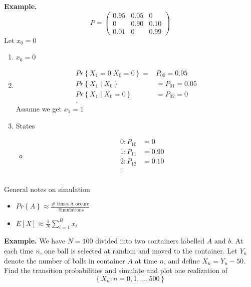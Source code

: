\documentclass{article}
\theoremstyle{remark}
\begin{document}
 \begin{tcolorbox}
   \textbf{Example.} 
   \[
   P = \begin{pmatrix}
   0.95  &  0.05  &  0 \\
   0  &  0.90  &  0.10 \\
   0.01  &  0  &  0.99
   \end{pmatrix} 
   \] 
   Let $x_{0} = 0$
   \begin{enumerate}
     \item $x_{0} = 0$  
     \item 
       \begin{align*}
       Pr \left \{ X_{1} = 0 | X_{0} = 0 \right \} = &  P_{00} = 0.95  \\
       Pr \left \{ X_{1}  \mid  X_{0}  \right \}  &=  P_{01} = 0.05 \\
       Pr \left \{ X_{1}  \mid  X_{0} = 0 \right \}  &=  P_{02} = 0 \\
       .\end{align*}
       Assume we get $x_{1} = 1$
     \item States 
       \begin{itemize}
         \item \[
             \begin{split}
         0: P_{10}  &=  0 \\
         1: P_{11 } &=  0.90 \\
         2: P_{12} &=  0.10 \\
         \vdots  \\
             \end{split} 
         \] 
       \end{itemize}
   \end{enumerate}
 \end{tcolorbox}

 \begin{tcolorbox}
   General notes on simulation 
   \begin{itemize}
     \item
   $Pr \left \{ A  \right \} \approx \frac{\text{# times A occure}}{ \text{ Simulations}}  $
 \item $E\left[ X \right] \approx \frac{1}{N}  \sum_{i=1}^{B}  x_{i}$
   \end{itemize}
 \end{tcolorbox}

   \textbf{Example.} We have $N=100$ divided into two containers labelled $A$ and $ b$. At each time $n$, one ball is selected at random and moved to the container. Let $Y_{n}$ denote the number of balls in container $A$ at time $n$, and define $X_{n} = Y_{n} -50$. Find the transition probabilities and simulate and plot one realization of \[
   \left\{ X_{n}: n  = 0,1, \ldots, 500 \right\}
   \] 
\end{document}
